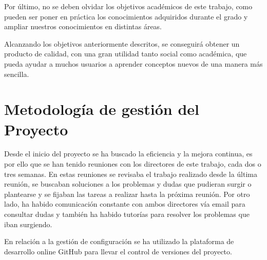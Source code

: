 Por último, no se deben olvidar los objetivos académicos de este trabajo, como pueden ser poner en práctica los conocimientos adquiridos durante el grado y ampliar nuestros conocimientos en distintas áreas. 

Alcanzando los objetivos anteriormente descritos, se conseguirá obtener un producto de calidad, con una gran utilidad tanto social como académica, que pueda ayudar a muchos usuarios a aprender conceptos nuevos de una manera más sencilla.
	
\section{Metodología de gestión del Proyecto}
\label{cap:sec:gestionProyecto}

Desde el inicio del proyecto se ha buscado la eficiencia y la mejora continua, es por ello que se han tenido reuniones con los directores de este trabajo, cada dos o tres semanas. En estas reuniones se revisaba el trabajo realizado desde la última reunión, se buscaban soluciones a los problemas y dudas que pudieran surgir o plantearse y se fijaban las tareas a realizar hasta la próxima reunión.
Por otro lado, ha habido comunicación constante con ambos directores vía email para consultar dudas y también ha habido tutorías para resolver los problemas que iban surgiendo. 

En relación a la gestión de configuración se ha utilizado la plataforma de desarrollo online GitHub para llevar el control de versiones del proyecto.

